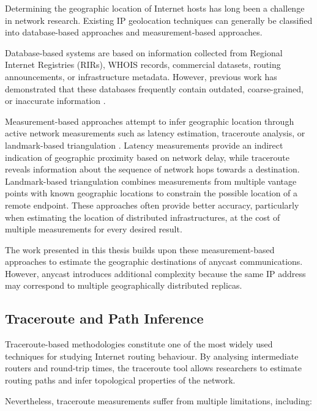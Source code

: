 Determining the geographic location of Internet hosts has long been a challenge in network research. Existing IP geolocation techniques can generally be classified into database-based approaches and measurement-based approaches.

Database-based systems are based on information collected from Regional Internet Registries (RIRs), WHOIS records, commercial datasets, routing announcements, or infrastructure metadata. However, previous work has demonstrated that these databases frequently contain outdated, coarse-grained, or inaccurate information \cite{Ding2015AnSub-networks, Dan2021IPInterpolation, Cozar2022ReliabilityTransfers}.

Measurement-based approaches attempt to infer geographic location through active network measurements such as latency estimation, traceroute analysis, or landmark-based triangulation \cite{Cicalese2015AGeolocation,Cicalese2016Latency-BasedSets,Ciavarrini2018GeolocationBound}. Latency measurements provide an indirect indication of geographic proximity based on network delay, while traceroute reveals information about the sequence of network hops towards a destination. Landmark-based triangulation combines measurements from multiple vantage points with known geographic locations to constrain the possible location of a remote endpoint. These approaches often provide better accuracy, particularly when estimating the location of distributed infrastructures, at the cost of multiple measurements for every desired result.

The work presented in this thesis builds upon these measurement-based approaches to estimate the geographic destinations of anycast communications. However, anycast introduces additional complexity because the same IP address may correspond to multiple geographically distributed replicas.

\subsection{Traceroute and Path Inference}
\label{sc:background_location_measurements_pathing}

Traceroute-based methodologies constitute one of the most widely used techniques for studying Internet routing behaviour. By analysing intermediate routers and round-trip times, the traceroute tool allows researchers to estimate routing paths and infer topological properties of the network.

Nevertheless, traceroute measurements suffer from multiple limitations, including:

